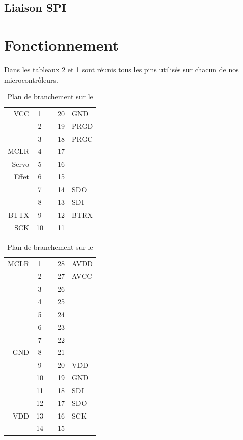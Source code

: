 	
			\subsection{Liaison SPI}

		\section{Fonctionnement}
		Dans les tableaux \ref{pinoutdspic} et \ref{pinoutpic} sont réunis tous les pins utilisés sur chacun de nos microcontrôleurs.
		\begin{table}
			\begin{center}
				\begin{tabular}{r|ccc|l}
	
				VCC		& 1 &   & 20 & GND \\ 
				  		& 2 &   & 19 & PRGD \\ 
				 		& 3 &   & 18 & PRGC \\ 
				MCLR 	& 4 &   & 17 &  \\ 
				Servo 	& 5 &   & 16 &   \\
				 Effet	& 6 &   & 15 &   \\ 
				  		& 7 &   & 14 & SDO \\ 
				  		& 8 &   & 13 & SDI \\ 
				BTTX 	& 9 &   & 12 & BTRX \\ 
				SCK 	& 10&   & 11 &   \\ 
				\end{tabular} 
			\end{center}
			\caption{Plan de branchement sur le \pic}
			\label{pinoutpic}
		\end{table}
		\begin{table}
			\begin{center}
				\begin{tabular}{r|ccc|l}
				MCLR 	& 1 &    & 28 & AVDD 	\\ 
				  		& 2 &    & 27 & AVCC 	\\ 
				  		& 3 &    & 26 &   		\\ 
				  		& 4 &    & 25 &  	 	\\ 
				  		& 5 &    & 24 & 		\\ 
				  		& 6 &    & 23 &   		\\ 
				 		& 7 &    & 22 &   		\\ 
				GND 	& 8 &    & 21 &   		\\ 
				  		& 9 &    & 20 & VDD 	\\ 
				  		& 10 &   & 19 & GND 	\\ 
				  		& 11 &   & 18 & SDI 	\\ 
				  		& 12 &   & 17 & SDO 	\\ 
				VDD 	& 13 &   & 16 & SCK 	\\ 
				  		& 14 &   & 15 &   		\\ 
				\end{tabular} 
			\end{center}
			\caption{Plan de branchement sur le \dspic}
			\label{pinoutdspic}
		\end{table}
